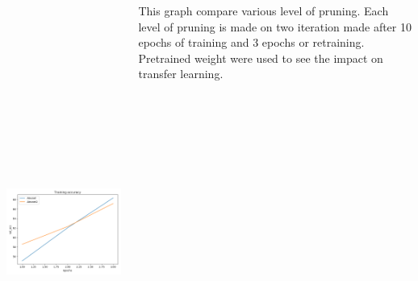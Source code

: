 \documentclass[25pt, a0paper,
               colspace=15mm, subcolspace=0mm,
               blockverticalspace=17mm,
               landscape]{tikzposter} %
\begin{document}
\begin{columns}
{\begin{center}
	\includegraphics[width=15cm, height=15cm]{figures/prune_ratio}
\end{center}

This graph compare various level of pruning. Each level of pruning is made on two iteration made after 10 epochs of training and 3 epochs or retraining. Pretrained weight were used to see the impact on transfer learning.
}

\end{columns}
\end{document}
